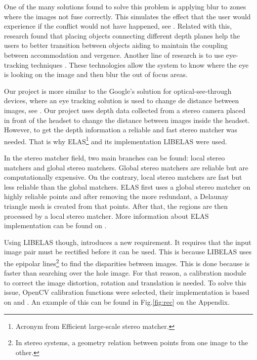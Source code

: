 \documentclass[10pt,a4paper,twocolumn,twoside]{article}
\begin{document}
	One of the many solutions found to solve this problem is applying blur to zones where the images not fuse correctly. This simulates the effect that the user would experience if the conflict would not have happened, see \cite{neareyeblur}. Related with this, research \cite{sceneComposition} found that placing objects connecting different depth planes help the users to better transition between objects aiding to maintain the coupling between accommodation and vergence. Another line of research is to use eye-tracking techniques \cite{eyeTracking}. These technologies allow the system to know where the eye is looking on the image and then blur the out of focus areas. 
	
	
	Our project is more similar to the Google's solution for optical-see-through devices, where an eye tracking solution is used to change de distance between images, see \cite{patentgoogle}. Our project uses depth data collected from a stereo camera placed in front of the headset to change the distance between images inside the headset. However, to get the depth information a reliable and fast stereo matcher was needed. That is why ELAS\footnote{Acronym from Efficient large-scale stereo matcher.} \cite{LIBELAS} and its implementation LIBELAS were used. 
		
	In the stereo matcher field, two main branches can be found: local stereo matchers and global stereo matchers. Global stereo matchers are reliable but are computationally expensive. On the contrary, local stereo matchers are fast but less reliable than the global matchers. ELAS first uses a global stereo matcher on highly reliable points and after removing the more redundant, a Delaunay triangle mesh is created from that points. After that, the regions are then processed by a local stereo matcher. More information about ELAS implementation can be found on \cite{LIBELAS}. 
	
	Using LIBELAS though, introduces a new requirement. It requires that the input image pair must be rectified before it can be used. This is because LIBELAS uses the epipolar lines\footnote{In stereo systems, a geometry relation between points from one image to the other. } to find the disparities between images. This is done because is faster than searching over the hole image. For that reason, a calibration module to correct the image distortion, rotation and translation is needed. To solve this issue, OpenCV calibration functions were selected, their implementation is based on \cite{bouguetcalibration} and \cite{calibrationopencv2}. An example of this can be found in Fig.\ref{fig:rec} on the Appendix.
\end{document}
